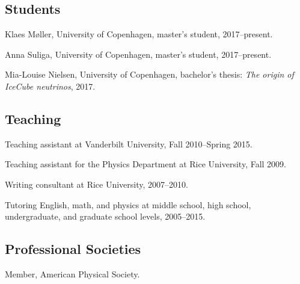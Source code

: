 \documentclass[letterpaper]{article}
\renewenvironment{itemize}{
\begin{list}{}{
\setlength{\leftmargin}{1.5em}
}
}{
\end{list}
}
\begin{document}
\subsection*{Students}
\begin{itemize}
\item Klaes M\o ller, University of Copenhagen, master's student, 2017--present.
\item Anna Suliga, University of Copenhagen, master's student, 2017--present.
\item Mia-Louise Nielsen, University of Copenhagen, bachelor's thesis: \emph{The origin of IceCube neutrinos}, 2017.
\end{itemize}

\subsection*{Teaching}
\begin{itemize}
\item Teaching assistant at Vanderbilt University, Fall 2010--Spring 2015.
\item Teaching assistant for the Physics Department at Rice University, Fall 2009.
\item Writing consultant at Rice University, 2007--2010.
\item Tutoring English, math, and physics at middle school, high school, undergraduate, and graduate school levels, 2005--2015.
\end{itemize}

\subsection*{Professional Societies}
\begin{itemize}
\item Member, American Physical Society.
\end{itemize}
\end{document}
